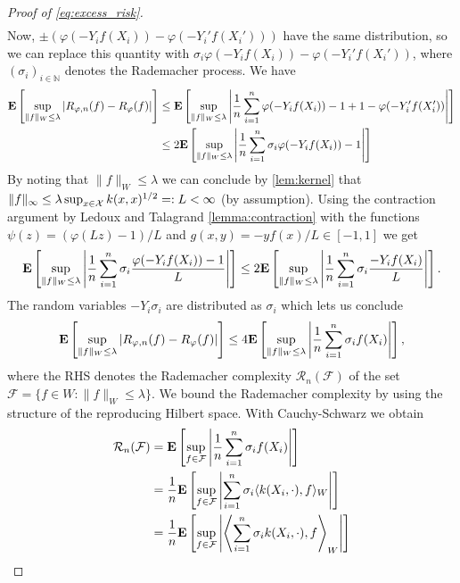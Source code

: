 \begin{proof}[Proof of \autoref{eq:excess_risk}]
\begin{align*}
\end{align*}
Now, $\pm(\varphi(-Y_if(X_i)) - \varphi(-Y_i'f(X_i')))$ have the same distribution, so we can replace this quantity with $\sigma_i\varphi(-Y_if(X_i)) - \varphi(-Y_i'f(X_i'))$, where $(\sigma_i)_{i\in \mathbb{N}}$ denotes the Rademacher process. We have
\begin{align*}
\mathbf{E}\left[\sup_{\|f\|_W\leq \lambda} \left|R_{\varphi,n}(f) - R_\varphi(f)\right|\right] &\leq \mathbf{E}\left[\sup_{\|f\|_W\leq \lambda} \left|\frac{1}{n}\sum_{i=1}^n\varphi(-Y_if(X_i)) - 1 + 1 - \varphi(-Y_i'f(X_i'))\right|\right] \\ 
&\leq 2\mathbf{E}\left[\sup_{\|f\|_W\leq \lambda} \left|\frac{1}{n}\sum_{i=1}^n\sigma_i\varphi(-Y_if(X_i)) - 1\right|\right]
\end{align*}
By noting that $\|f\|_W \leq \lambda$ we can conclude by \autoref{lem:kernel} that
$\|f\|_\infty \leq \lambda \sup_{x\in\mathcal{X}}k(x, x)^{1/2} =: L < \infty$ (by assumption).
Using the contraction argument by Ledoux and Talagrand \autoref{lemma:contraction} with the functions $\psi(z) = (\varphi(Lz) - 1)/L$ and $g(x, y) = -yf(x)/L \in [-1, 1]$ we get
\begin{equation*}
\mathbf{E}\left[\sup_{\|f\|_W\leq \lambda} \left|\frac{1}{n}\sum_{i=1}^n\sigma_i\frac{\varphi(-Y_if(X_i)) - 1}{L}\right|\right] \leq 2\mathbf{E}\left[\sup_{\|f\|_W\leq \lambda} \left|\frac{1}{n}\sum_{i=1}^n\sigma_i\frac{-Y_if(X_i)}{L}\right|\right].
\end{equation*}
The random variables $-Y_i\sigma_i$ are distributed as $\sigma_i$ which lets us conclude
\begin{equation*}
	\mathbf{E}\left[\sup_{\|f\|_W\leq \lambda} \left|R_{\varphi,n}(f) - R_\varphi(f)\right|\right] \leq 4 \mathbf{E}\left[\sup_{\|f\|_W\leq \lambda} \left|\frac{1}{n}\sum_{i=1}^n\sigma_if(X_i)\right|\right],
\end{equation*}
where the RHS denotes the Rademacher complexity $\mathcal{R}_n(\mathcal{F})$ of the set $\mathcal{F} = \{f \in W: \|f\|_W \leq \lambda\}$.
We bound the Rademacher complexity by using the structure of the reproducing Hilbert space. With Cauchy-Schwarz we obtain
\begin{align*}
	\mathcal{R}_n(\mathcal{F}) &= \E \left[\sup_{f \in \mathcal{F}} \left|\frac{1}{n}\sum_{i=1}^n \sigma_i f(X_i)  \right| \right] \\
	& = \frac{1}{n}\E \left[\sup_{f \in \mathcal{F}} \left|\sum_{i=1}^n \sigma_i \langle k(X_i, \cdot), f \rangle_W  \right| \right] \\
	& = \frac{1}{n} \E \left[\sup_{f \in \mathcal{F}} \left|\left\langle\sum_{i=1}^n \sigma_i  k(X_i, \cdot), f \right\rangle_W  \right| \right] \\ 

\end{align*}
\end{proof}
